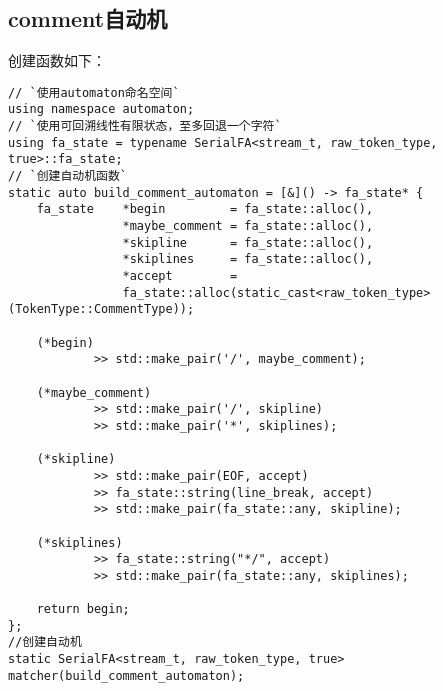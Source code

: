 \documentclass[UTF8]{ctexart}
\begin{document}
\subsection{comment自动机}
\begin{figure}[!h]
    \centering
\end{figure}
\par 创建函数如下：
{\firacode
\begin{lstlisting}[language={[ANSI]C++}]
// `使用automaton命名空间`
using namespace automaton;
// `使用可回溯线性有限状态，至多回退一个字符`
using fa_state = typename SerialFA<stream_t, raw_token_type, true>::fa_state;
// `创建自动机函数`
static auto build_comment_automaton = [&]() -> fa_state* {
    fa_state    *begin         = fa_state::alloc(),
                *maybe_comment = fa_state::alloc(),
                *skipline      = fa_state::alloc(),
                *skiplines     = fa_state::alloc(),
                *accept        = 
                fa_state::alloc(static_cast<raw_token_type>(TokenType::CommentType));
    
    (*begin)
            >> std::make_pair('/', maybe_comment);
    
    (*maybe_comment)
            >> std::make_pair('/', skipline)
            >> std::make_pair('*', skiplines);
            
    (*skipline)
            >> std::make_pair(EOF, accept)
            >> fa_state::string(line_break, accept)
            >> std::make_pair(fa_state::any, skipline);
            
    (*skiplines)
            >> fa_state::string("*/", accept)
            >> std::make_pair(fa_state::any, skiplines);

    return begin;
};
//创建自动机
static SerialFA<stream_t, raw_token_type, true> matcher(build_comment_automaton);
\end{lstlisting}
}
\end{document}

